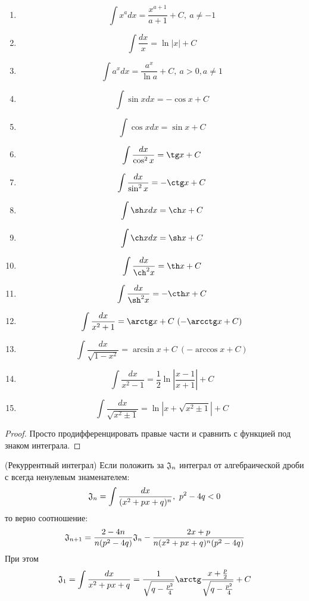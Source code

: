 \begin{enumerate}
	\item \[
		\int x^a dx = \frac{x^{a + 1}}{a + 1} + C,\ a \neq -1
	\]
	
	\item \[
		\int \frac{dx}{x} = \ln |x| + C
	\]
	
	\item \[
		\int a^x dx = \frac{a^x}{\ln a} + C,\ a > 0, a \neq 1
	\]
	
	\item \[
		\int \sin x dx = -\cos x + C
	\]
	
	\item \[
		\int \cos x dx = \sin x + C
	\]
	
	\item \[
		\int \frac{dx}{\cos^2 x} = \tg x + C
	\]
	
	\item \[
		\int \frac{dx}{\sin^2 x} = -\ctg x + C
	\]
	
	\item \[
		\int \sh x dx = \ch x + C
	\]
	
	\item \[
		\int \ch x dx = \sh x + C
	\]
	
	\item \[
		\int \frac{dx}{\ch^2 x} = \th x + C
	\]
	
	\item \[
		\int \frac{dx}{\sh^2 x} = -\cth x + C
	\]
	
	\item \[
		\int \frac{dx}{x^2 + 1} = \arctg x + C\ (-\arcctg x + C)
	\]
	
	\item \[
		\int \frac{dx}{\sqrt{1 - x^2}} = \arcsin x + C\ (-\arccos x + C)
	\]
	
	\item \[
		\int \frac{dx}{x^2 - 1} = \frac{1}{2}\ln \left|\frac{x - 1}{x + 1}\right| + C
	\]
	
	\item \[
		\int \frac{dx}{\sqrt{x^2 \pm 1}} = \ln |x + \sqrt{x^2 \pm 1}| + C
	\]
\end{enumerate}

\begin{proof}
	Просто продифференцировать правые части и сравнить с функцией под знаком интеграла.
\end{proof}

\begin{lemma} (Рекуррентный интеграл)
	Если положить за $\mathfrak{J}_n$ интеграл от алгебраической дроби с всегда ненулевым знаменателем:
	\[
		\mathfrak{J}_n = \int \frac{dx}{(x^2 + px + q)^n},\ p^2 - 4q < 0
	\]
	то верно соотношение:
	\[
		\mathfrak{J}_{n + 1} = \frac{2 - 4n}{n(p^2 - 4q)}\mathfrak{J}_n - \frac{2x + p}{n(x^2 + px + q)^n(p^2 - 4q)}
	\]
	При этом
	\[
		\goth{J}_1 = \int \frac{dx}{x^2 + px + q} = \frac{1}{\sqrt{q - \frac{p^2}{4}}} \arctg \frac{x + \frac{p}{2}}{\sqrt{q - \frac{p^2}{4}}} + C
	\]
\end{lemma}

